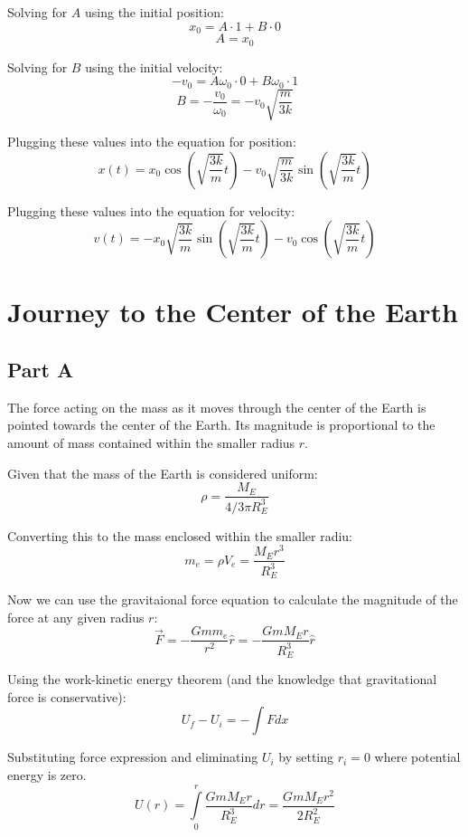 \documentclass{article}
\begin{document}
Solving for $A$ using the initial position:
$$ x_{0} = A \cdot 1 + B \cdot 0 $$
$$ A = x_{0} $$

Solving for $B$ using the initial velocity:
$$ -v_{0} = A \omega_{0} \cdot 0 + B \omega_{0} \cdot 1 $$
$$ B = -\frac{ v_{0} }{ \omega_{0} } = -v_{0} \sqrt{ \frac{ m }{ 3k } } $$

Plugging these values into the equation for position:
$$ x( t ) = x_{0} \cos \left( \sqrt{ \frac{ 3k }{ m } } t \right) - v_{0} \sqrt{
\frac{ m }{ 3k } } \sin \left( \sqrt{ \frac{ 3k }{ m } } t \right) $$

Plugging these values into the equation for velocity:
$$ v( t ) = -x_{0} \sqrt{ \frac{ 3k }{ m } } \sin \left( \sqrt{ \frac{ 3k }{ m }
} t \right) - v_{0} \cos \left( \sqrt{ \frac{ 3k }{ m } } t \right) $$

\section{ Journey to the Center of the Earth }

\subsection*{ Part A }

The force acting on the mass as it moves through the center of the Earth is
pointed towards the center of the Earth. Its magnitude is proportional to the
amount of mass contained within the smaller radius $r$.

\bigbreak

Given that the mass of the Earth is considered uniform:
$$ \rho = \frac{ M_{E} }{ 4/3 \pi R_{E}^{3} } $$

Converting this to the mass enclosed within the smaller radiu:
$$ m_{e} = \rho V_{e} = \frac{ M_{E} r^{3} }{ R_{E}^{3} } $$

Now we can use the gravitaional force equation to calculate the magnitude of the
force at any given radius $r$:
$$ \vec{ F } = -\frac{ G m m_{e} }{ r^{2} } \hat{ r } = -\frac{ G m M_{E} r }{
R_{E}^{3} } \hat{ r } $$

Using the work-kinetic energy theorem (and the knowledge that gravitational
force is conservative):
$$ U_{f} - U_{i} = - \int F dx $$

Substituting force expression and eliminating $U_{i}$ by setting $r_{i} = 0$
where potential energy is zero.
$$ U( r ) = \int \limits_{0}^{r} \frac{ G m M_{E} r }{ R_{E}^{3} } dr = \frac{ G
m M_{E} r^{2} }{ 2 R_{E}^{2} }$$
\end{document}
